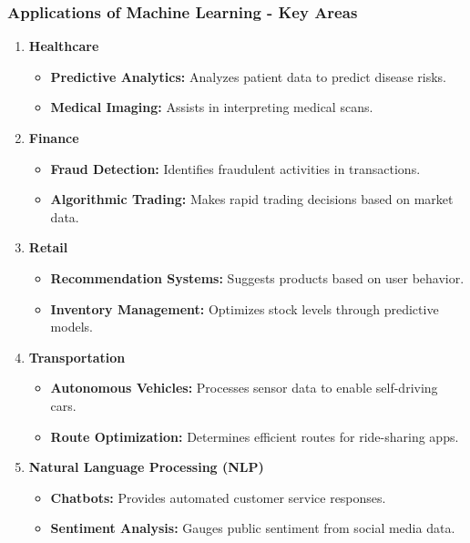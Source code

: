 \documentclass[aspectratio=169]{beamer}
\begin{document}
\begin{frame}[fragile]
    \frametitle{Applications of Machine Learning - Key Areas}
    \begin{enumerate}
        \item \textbf{Healthcare}
            \begin{itemize}
                \item \textbf{Predictive Analytics:} Analyzes patient data to predict disease risks.
                \item \textbf{Medical Imaging:} Assists in interpreting medical scans.
            \end{itemize}
        
        \item \textbf{Finance}
            \begin{itemize}
                \item \textbf{Fraud Detection:} Identifies fraudulent activities in transactions.
                \item \textbf{Algorithmic Trading:} Makes rapid trading decisions based on market data.
            \end{itemize}
        
        \item \textbf{Retail}
            \begin{itemize}
                \item \textbf{Recommendation Systems:} Suggests products based on user behavior.
                \item \textbf{Inventory Management:} Optimizes stock levels through predictive models.
            \end{itemize}
        
        \item \textbf{Transportation}
            \begin{itemize}
                \item \textbf{Autonomous Vehicles:} Processes sensor data to enable self-driving cars.
                \item \textbf{Route Optimization:} Determines efficient routes for ride-sharing apps.
            \end{itemize}
        
        \item \textbf{Natural Language Processing (NLP)}
            \begin{itemize}
                \item \textbf{Chatbots:} Provides automated customer service responses.
                \item \textbf{Sentiment Analysis:} Gauges public sentiment from social media data.
            \end{itemize}
    \end{enumerate}
\end{frame}
\end{document}
